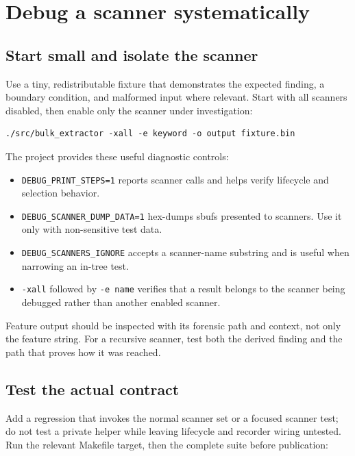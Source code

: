 \documentclass[11pt]{article}
\newcommand{\code}[1]{\texttt{#1}}
\begin{document}
\section{Debug a scanner systematically}

\subsection{Start small and isolate the scanner}

Use a tiny, redistributable fixture that demonstrates the expected finding,
a boundary condition, and malformed input where relevant. Start with all
scanners disabled, then enable only the scanner under investigation:

\begin{Verbatim}
./src/bulk_extractor -xall -e keyword -o output fixture.bin
\end{Verbatim}

The project provides these useful diagnostic controls:

\begin{itemize}
\item \code{DEBUG\_PRINT\_STEPS=1} reports scanner calls and helps verify
  lifecycle and selection behavior.
\item \code{DEBUG\_SCANNER\_DUMP\_DATA=1} hex-dumps sbufs presented to
  scanners. Use it only with non-sensitive test data.
\item \code{DEBUG\_SCANNERS\_IGNORE} accepts a scanner-name substring and is
  useful when narrowing an in-tree test.
\item \code{-xall} followed by \code{-e name} verifies that a result belongs
  to the scanner being debugged rather than another enabled scanner.
\end{itemize}

Feature output should be inspected with its forensic path and context, not
only the feature string. For a recursive scanner, test both the derived
finding and the path that proves how it was reached.

\subsection{Test the actual contract}

Add a regression that invokes the normal scanner set or a focused scanner
test; do not test a private helper while leaving lifecycle and recorder wiring
untested. Run the relevant Makefile target, then the complete suite before
publication:
\end{document}
